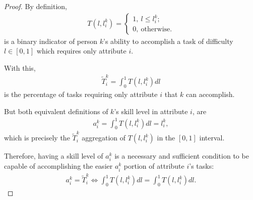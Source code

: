 \documentclass[hidelinks, nonatbib]{elsarticle}
\begin{document}
\begin{proof}
    By definition,
    \begin{gather}
        T(l, l_{i}^{k}) =
        \begin{cases}
            1, \ l \leq l_{i}^{k}; \\
            0, \ \text{otherwise.}
        \end{cases}
    \end{gather}
    is a binary indicator of person $k$'s ability to accomplish a task of difficulty $l \in [0,1]$ which requires only attribute $i$.
    
    With this,
    \begin{gather}
        \tilde{T}_{i}^{k}
        =
        \int_{0}^{1}{
        T(l, l_{i}^{k})
        dl
        }
    \end{gather}
    is the percentage of tasks requiring only attribute $i$ that $k$ can accomplish.

    But both equivalent definitions of $k$'s skill level in attribute $i$, are
    \begin{gather}
        a_{i}^{k} = 
        \int_{0}^{1}{
        T(l, l_{i}^{k})
        dl
        }
        =
        l_{i}^{k}
        ,
    \end{gather}
    which is precisely the $\tilde{T}_{i}^{k}$ aggregation of $T(l, l_{i}^{k})$ in the $[0,1]$ interval.

    Therefore, having a skill level of $a_{i}^{k}$ is a necessary and sufficient condition to be capable of accomplishing the easier $a_{i}^{k}$ portion of attribute $i$'s tasks:
    \begin{gather}
        a_{i}^{k} =
        \tilde{T}_{i}^{k}
        \iff
        \int_{0}^{1}{
        T(l, l_{i}^{k})
        dl
        } =
        \int_{0}^{1}{
        T(l, l_{i}^{k})
        dl
        }
        .
    \end{gather}
\end{proof}
\end{document}
